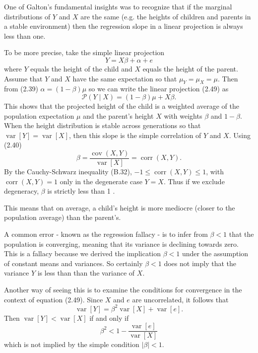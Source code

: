 \documentclass[10pt]{article}
\begin{document}
One of Galton's fundamental insights was to recognize that if the marginal distributions of $Y$ and $X$ are the same (e.g. the heights of children and parents in a stable environment) then the regression slope in a linear projection is always less than one.

To be more precise, take the simple linear projection
$$
Y=X \beta+\alpha+e
$$
where $Y$ equals the height of the child and $X$ equals the height of the parent. Assume that $Y$ and $X$ have the same expectation so that $\mu_{Y}=\mu_{X}=\mu$. Then from (2.39) $\alpha=(1-\beta) \mu$ so we can write the linear projection (2.49) as
$$
\mathscr{P}(Y \mid X)=(1-\beta) \mu+X \beta .
$$
This shows that the projected height of the child is a weighted average of the population expectation $\mu$ and the parent's height $X$ with weights $\beta$ and $1-\beta$. When the height distribution is stable across generations so that $\operatorname{var}[Y]=\operatorname{var}[X]$, then this slope is the simple correlation of $Y$ and $X$. Using (2.40)
$$
\beta=\frac{\operatorname{cov}(X, Y)}{\operatorname{var}[X]}=\operatorname{corr}(X, Y) .
$$
By the Cauchy-Schwarz inequality (B.32), $-1 \leq \operatorname{corr}(X, Y) \leq 1$, with $\operatorname{corr}(X, Y)=1$ only in the degenerate case $Y=X$. Thus if we exclude degeneracy, $\beta$ is strictly less than 1 .

This means that on average, a child's height is more mediocre (closer to the population average) than the parent's.

A common error - known as the regression fallacy - is to infer from $\beta<1$ that the population is converging, meaning that its variance is declining towards zero. This is a fallacy because we derived the implication $\beta<1$ under the assumption of constant means and variances. So certainly $\beta<1$ does not imply that the variance $Y$ is less than than the variance of $X$.

Another way of seeing this is to examine the conditions for convergence in the context of equation (2.49). Since $X$ and $e$ are uncorrelated, it follows that
$$
\operatorname{var}[Y]=\beta^{2} \operatorname{var}[X]+\operatorname{var}[e] .
$$
Then $\operatorname{var}[Y]<\operatorname{var}[X]$ if and only if
$$
\beta^{2}<1-\frac{\operatorname{var}[e]}{\operatorname{var}[X]}
$$
which is not implied by the simple condition $|\beta|<1$.
\end{document}
